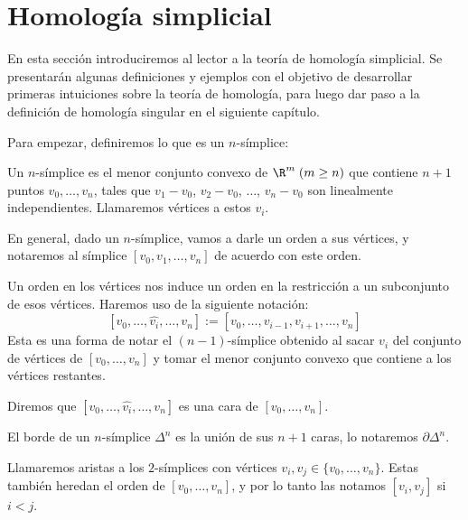 \chapter{Homología simplicial}

En esta sección introduciremos al lector a la teoría de homología simplicial. Se presentarán algunas definiciones y ejemplos con el objetivo de desarrollar primeras intuiciones sobre la teoría de homología, para luego dar paso a la definición de homología singular en el siguiente capítulo. \br 


Para empezar, definiremos lo que es un $n$-símplice:\br

\begin{df} Un $n$-símplice es el menor conjunto convexo de $\R^{m}\; (m\geq n)$ que contiene $n+1$ puntos $v_0,\dots,v_n$, tales que $v_1-v_0$, $v_2-v_0$, $\dots$, $v_n-v_0$ son linealmente independientes. Llamaremos vértices a estos $v_i$.\end{df}\br

En general, dado un $n$-símplice, vamos a darle un orden a sus vértices, y notaremos al símplice $[v_0,v_1,\dots,v_n]$ de acuerdo con este orden. \br

\begin{df}
Un orden en los vértices nos induce un orden en la restricción a un subconjunto de esos vértices. Haremos uso de la siguiente notación:
$$[v_0,\dots,\hat{v_i},\dots,v_n]:=[v_0,\dots,v_{i-1},v_{i+1},\dots,v_n]$$ \br
Esta es una forma de notar el $(n-1)$-símplice obtenido al sacar $v_i$ del conjunto de vértices de $[v_0,\dots,v_n]$ y tomar el menor conjunto convexo que contiene a los vértices restantes. \br

Diremos que $[v_0,\dots,\hat{v_i},\dots,v_n]$ es una cara de $[v_0,\dots,v_n]$.\br

\begin{obs}
El borde de un $n$-símplice $\Delta^n$ es la unión de sus $n+1$ caras, lo notaremos $\partial\Delta^n$. \br
\end{obs}

Llamaremos aristas a los $2$-símplices con vértices $v_i, v_j\in\{v_0,\dots,v_n\}$. Estas también heredan el orden de $[v_0,\dots,v_n]$, y por lo tanto las notamos $[v_i,v_j]$ si $i<j$.\br
\end{df}


